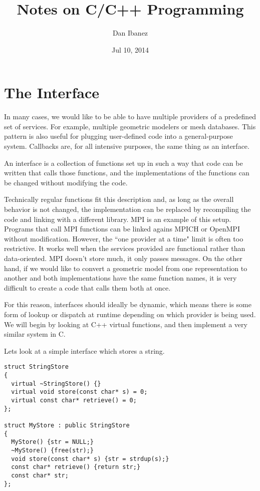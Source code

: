 \documentclass{article}
\title{Notes on C/C++ Programming}
\author{Dan Ibanez}
\date{Jul 10, 2014}
\begin{document}
\lstset{language=C++,style=myc}

\maketitle

\section{The Interface}

In many cases, we would like to be able to have multiple providers of a
predefined set of services.
For example, multiple geometric modelers or mesh databases.
This pattern is also useful for plugging user-defined code into a
general-purpose system.
Callbacks are, for all intensive purposes, the same thing as an interface.

An interface is a collection of functions set up in such a way that code
can be written that calls those functions, and the implementations of the
functions can be changed without modifying the code.

Technically regular functions fit this description and, as long as the overall
behavior is not changed, the implementation can be replaced by recompiling
the code and linking with a different library.
MPI is an example of this setup.
Programs that call MPI functions can be linked agains MPICH or OpenMPI
without modification.
However, the ``one provider at a time" limit is often too restrictive.
It works well when the services provided are functional rather than
data-oriented.
MPI doesn't store much, it only passes messages.
On the other hand, if we would like to convert a geometric model from
one representation to another and both implementations have the same
function names, it is very difficult to create a code that calls them
both at once.

For this reason, interfaces should ideally be dynamic, which means there
is some form of lookup or dispatch at runtime depending on which provider
is being used.
We will begin by looking at C++ virtual functions, and then implement
a very similar system in C.

Lets look at a simple interface which stores a string.

\begin{lstlisting}
struct StringStore
{
  virtual ~StringStore() {}
  virtual void store(const char* s) = 0;
  virtual const char* retrieve() = 0;
};

struct MyStore : public StringStore
{
  MyStore() {str = NULL;}
  ~MyStore() {free(str);}
  void store(const char* s) {str = strdup(s);}
  const char* retrieve() {return str;}
  const char* str;
};
\end{lstlisting}
\end{document}
